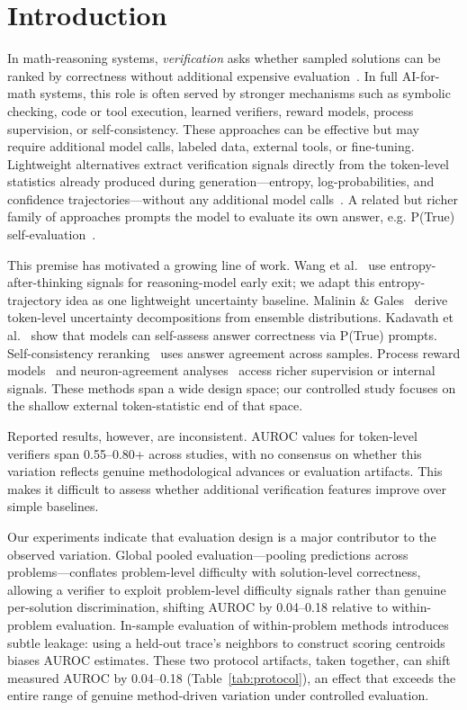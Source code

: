 \documentclass{article}
\begin{document}
\section{Introduction}
\label{sec:intro}

In math-reasoning systems, \textit{verification} asks whether sampled solutions can be ranked by correctness without additional expensive evaluation~\cite{hendrycks2021measuring,cobbe2021gsm8k}. In full AI-for-math systems, this role is often served by stronger mechanisms such as symbolic checking, code or tool execution, learned verifiers, reward models, process supervision, or self-consistency. These approaches can be effective but may require additional model calls, labeled data, external tools, or fine-tuning. Lightweight alternatives extract verification signals directly from the token-level statistics already produced during generation---entropy, log-probabilities, and confidence trajectories---without any additional model calls~\cite{wang2025eat,malinin2021uncertainty}. A related but richer family of approaches prompts the model to evaluate its own answer, e.g. P(True) self-evaluation~\cite{kadavath2022language}.

This premise has motivated a growing line of work. Wang et al.~\cite{wang2025eat} use entropy-after-thinking signals for reasoning-model early exit; we adapt this entropy-trajectory idea as one lightweight uncertainty baseline. Malinin \& Gales~\cite{malinin2021uncertainty} derive token-level uncertainty decompositions from ensemble distributions. Kadavath et al.~\cite{kadavath2022language} show that models can self-assess answer correctness via P(True) prompts. Self-consistency reranking~\cite{wang2023selfconsistency} uses answer agreement across samples. Process reward models~\cite{lightman2023let,uesato2022solving} and neuron-agreement analyses~\cite{chen2025nad} access richer supervision or internal signals. These methods span a wide design space; our controlled study focuses on the shallow external token-statistic end of that space.

Reported results, however, are inconsistent. AUROC values for token-level verifiers span 0.55--0.80+ across studies, with no consensus on whether this variation reflects genuine methodological advances or evaluation artifacts. This makes it difficult to assess whether additional verification features improve over simple baselines.

Our experiments indicate that evaluation design is a major contributor to the observed variation. Global pooled evaluation---pooling predictions across problems---conflates problem-level difficulty with solution-level correctness, allowing a verifier to exploit problem-level difficulty signals rather than genuine per-solution discrimination, shifting AUROC by 0.04--0.18 relative to within-problem evaluation. In-sample evaluation of within-problem methods introduces subtle leakage: using a held-out trace's neighbors to construct scoring centroids biases AUROC estimates. These two protocol artifacts, taken together, can shift measured AUROC by 0.04--0.18 (Table~\ref{tab:protocol}), an effect that exceeds the entire range of genuine method-driven variation under controlled evaluation.
\end{document}
